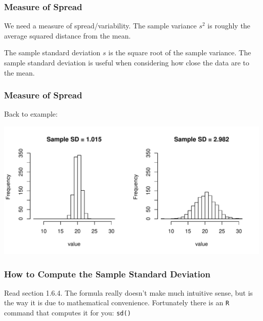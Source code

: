 \documentclass[handout]{beamer}
\newcommand{\blue}[1]{\textcolor{blue2}{#1}}
\begin{document}
\begin{frame}[fragile]
\frametitle{Measure of Spread}

We need a measure of \blue{spread/variability}.  The \blue{sample variance $s^2$} is roughly the average squared distance from the mean.

\vspace{0.5cm}

The \blue{sample standard deviation $s$} is the square root of the sample variance. The sample standard deviation is useful when considering how close the data are to the mean.

\end{frame}



\begin{frame}[fragile]
\frametitle{Measure of Spread}
Back to example:
\begin{center}
\includegraphics[width=\textwidth]{figure/spread2.pdf}
\end{center}

\end{frame}



\begin{frame}[fragile]
\frametitle{How to Compute the Sample Standard Deviation}

Read section 1.6.4.  The formula really doesn't make much intuitive sense, but is the way it is due to mathematical convenience.  Fortunately there is an {\tt R} command that computes it for you: {\tt sd()}

\end{frame}
\end{document}
